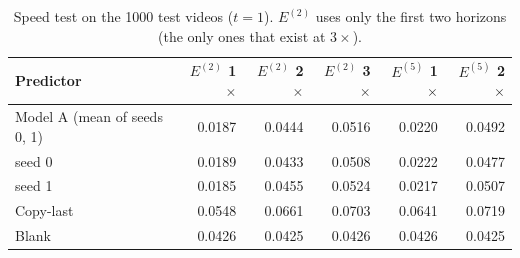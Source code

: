\begin{table}[H]\centering\small
\caption{Speed test on the 1000 test videos ($t=1$). $E^{(2)}$ uses only the first two horizons (the only ones that exist at $3\times$).}\label{tab:t4}
\begin{tabular}{lrrrrr}\toprule
Predictor & $E^{(2)}$ 1$\times$ & $E^{(2)}$ 2$\times$ & $E^{(2)}$ 3$\times$ & $E^{(5)}$ 1$\times$ & $E^{(5)}$ 2$\times$ \\ \midrule
Model A (mean of seeds 0, 1) & 0.0187 & 0.0444 & 0.0516 & 0.0220 & 0.0492 \\
\quad seed 0 & 0.0189 & 0.0433 & 0.0508 & 0.0222 & 0.0477 \\
\quad seed 1 & 0.0185 & 0.0455 & 0.0524 & 0.0217 & 0.0507 \\
Copy-last & 0.0548 & 0.0661 & 0.0703 & 0.0641 & 0.0719 \\
Blank & 0.0426 & 0.0425 & 0.0426 & 0.0426 & 0.0425 \\
\bottomrule\end{tabular}
\end{table}
